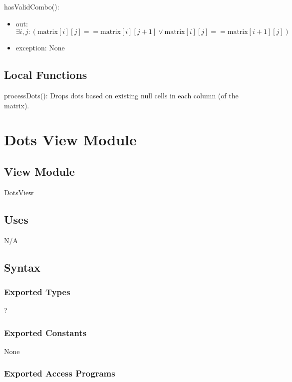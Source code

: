 \documentclass[12pt]{article}
\begin{document}
\noindent hasValidCombo():
\begin{itemize}
\item out: $\exists i, j: (\mbox{matrix}[i][j] == \mbox{matrix}[i][j+1] \lor \mbox{matrix}[i][j] == \mbox{matrix}[i+1][j]) $
\item exception: None
\end{itemize}
\bigskip
\subsection*{Local Functions}
processDots(): Drops dots based on existing null cells in each column (of the matrix).

\newpage

\section* {Dots View Module}

\subsection* {View Module}
DotsView

\subsection* {Uses}
N/A

\subsection* {Syntax}

\subsubsection* {Exported Types}
?

\subsubsection* {Exported Constants}
None

\subsubsection* {Exported Access Programs}
\end{document}
